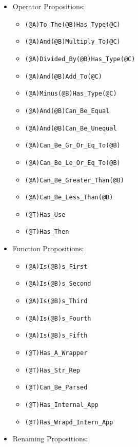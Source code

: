 \documentclass{article}
\begin{document}
\begin{itemize}

\item Operator Propositions:

  \begin{itemize}
  \item \texttt{(@A)To_The(@B)Has_Type(@C)}
  \item \texttt{(@A)And(@B)Multiply_To(@C)}
  \item \texttt{(@A)Divided_By(@B)Has_Type(@C)}
  \item \texttt{(@A)And(@B)Add_To(@C)}
  \item \texttt{(@A)Minus(@B)Has_Type(@C)}
  \item \texttt{(@A)And(@B)Can_Be_Equal}
  \item \texttt{(@A)And(@B)Can_Be_Unequal}
  \item \texttt{(@A)Can_Be_Gr_Or_Eq_To(@B)}
  \item \texttt{(@A)Can_Be_Le_Or_Eq_To(@B)}
  \item \texttt{(@A)Can_Be_Greater_Than(@B)}
  \item \texttt{(@A)Can_Be_Less_Than(@B)}
  \item \texttt{(@T)Has_Use}
  \item \texttt{(@T)Has_Then}
  \end{itemize}

\item Function Propositions:

  \begin{itemize}
  \item \texttt{(@A)Is(@B)s_First}
  \item \texttt{(@A)Is(@B)s_Second}
  \item \texttt{(@A)Is(@B)s_Third}
  \item \texttt{(@A)Is(@B)s_Fourth}
  \item \texttt{(@A)Is(@B)s_Fifth}
  \item \texttt{(@T)Has_A_Wrapper}
  \item \texttt{(@T)Has_Str_Rep}
  \item \texttt{(@T)Can_Be_Parsed}
  \item \texttt{(@T)Has_Internal_App}
  \item \texttt{(@T)Has_Wrapd_Intern_App}
  \end{itemize}

\item Renaming Propositions:


\end{itemize}
\end{document}
